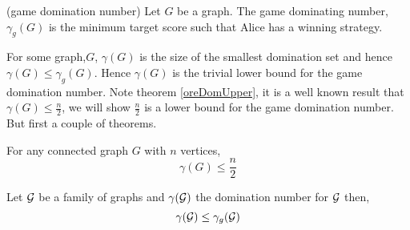 \begin{definition}(game domination number)
    Let $G$ be a graph. The game dominating number, $\gamma_g(G)$ is the minimum target score such that Alice has a winning strategy.
\end{definition} 

%        
%
%    
%
%
%
%
%    
    
For some graph,$G$, $\gamma(G)$ is the size of the smallest domination set and hence $\gamma(G)\leq\gamma_g(G)$. Hence $\gamma(G)$ is the trivial lower bound for the game domination number. Note theorem \ref{oreDomUpper}, it is a well known result that $\gamma(G) \leq \frac{n}{2}$, we will show $\frac{n}{2}$ is a lower bound for the game domination number. But first a couple of theorems.

\begin{theorem} \label{oreDomUpper} 
    For any connected graph $G$ with $n$ vertices,     
    \[\gamma(G) \leq \frac{n}{2}\]
\end{theorem}


\begin{theorem}\label{thm:domlow}
    Let $\mathcal{G}$ be a family of graphs and $\gamma(\mathcal{G})$ the domination number for $\mathcal{G}$ then,
    \[\gamma(\mathcal{G}) \leq  \gamma_g(\mathcal{G})\]
\end{theorem}

